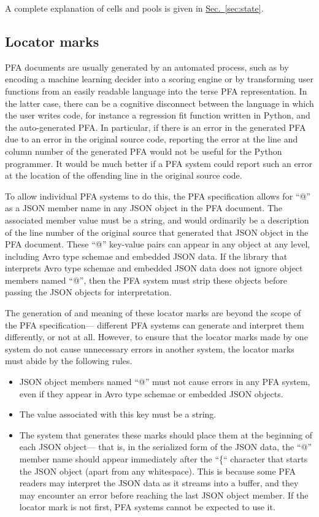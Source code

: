 \documentclass{article}
\theoremstyle{definition}
\begin{document}
A complete explanation of cells and pools is given in \hyperlink{hsec:state}{Sec.~\ref{sec:state}}.

\subsection{Locator marks}

PFA documents are usually generated by an automated process, such as by encoding a machine learning decider into a scoring engine or by transforming user functions from an easily readable language into the terse PFA representation.  In the latter case, there can be a cognitive disconnect between the language in which the user writes code, for instance a regression fit function written in Python, and the auto-generated PFA.  In particular, if there is an error in the generated PFA due to an error in the original source code, reporting the error at the line and column number of the generated PFA would not be useful for the Python programmer.  It would be much better if a PFA system could report such an error at the location of the offending line in the original source code.

To allow individual PFA systems to do this, the PFA specification allows for ``@'' as a JSON member name in any JSON object in the PFA document.  The associated member value must be a string, and would ordinarily be a description of the line number of the original source that generated that JSON object in the PFA document.  These ``@'' key-value pairs can appear in any object at any level, including Avro type schemae and embedded JSON data.  If the library that interprets Avro type schemae and embedded JSON data does not ignore object members named ``@'', then the PFA system must strip these objects before passing the JSON objects for interpretation.

The generation of and meaning of these locator marks are beyond the scope of the PFA specification--- different PFA systems can generate and interpret them differently, or not at all.  However, to ensure that the locator marks made by one system do not cause unnecessary errors in another system, the locator marks must abide by the following rules.
\begin{itemize}
\item JSON object members named ``@'' must not cause errors in any PFA system, even if they appear in Avro type schemae or embedded JSON objects.
\item The value associated with this key must be a string.
\item The system that generates these marks should place them at the beginning of each JSON object--- that is, in the serialized form of the JSON data, the ``@'' member name should appear immediately after the ``\{`` character that starts the JSON object (apart from any whitespace).  This is because some PFA readers may interpret the JSON data as it streams into a buffer, and they may encounter an error before reaching the last JSON object member.  If the locator mark is not first, PFA systems cannot be expected to use it.
\end{itemize}
\end{document}
